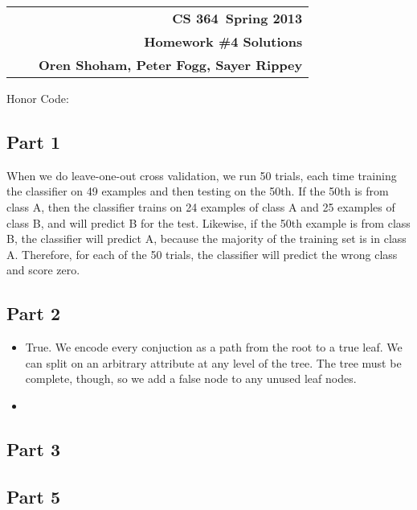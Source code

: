 \documentclass[11pt]{article}
\makeatletter
\newcommand{\course}{CS 364}
\newcommand{\semester}{Spring 2013}
\newcommand{\hwk}{Homework \#4 Solutions}
\newcommand{\student}{Oren Shoham, Peter Fogg, Sayer Rippey}
\renewcommand\maketitle{
\begin{center}
\begin{tabular*}{6.44in}{l @{\extracolsep{\fill}}c r}
\bfseries  &  & \bfseries \course ~\semester \\
\bfseries&  & \bfseries  \hwk  \\
\bfseries   &   &  \bfseries \student \\ 
\end{tabular*}
\end{center} }
\makeatother
\begin{document}
\maketitle
\thispagestyle{plain}


\noindent Honor Code: 

\subsection*{Part 1}
When we do leave-one-out cross validation, we run 50 trials, each time training the classifier on 49  examples and then testing on the 50th. If the 50th is from class A, then the classifier trains on 24 examples of class A and 25 examples of class B, and will predict B for the test. Likewise, if the 50th example is from class B, the classifier will predict A, because the majority of the training set is in class A. Therefore, for each of the 50 trials, the classifier will predict the wrong class and score zero.
\subsection*{Part 2}
\begin{itemize}
\item True. We encode every conjuction as a path from the root to a true leaf. We can split on an arbitrary attribute at any level of the tree. The tree must be complete, though, so we add a false node to any unused leaf nodes.
\item
\end{itemize}
\subsection*{Part 3}

\subsection*{Part 5}
\end{document}
